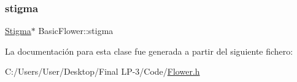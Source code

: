 \subsubsection{\texorpdfstring{stigma}{stigma}}
{\footnotesize\ttfamily \mbox{\hyperlink{class_stigma}{Stigma}}$\ast$ Basic\+Flower\+::stigma}



La documentación para esta clase fue generada a partir del siguiente fichero\+:\begin{DoxyCompactItemize}
\item 
C\+:/\+Users/\+User/\+Desktop/\+Final L\+P-\/3/\+Code/\mbox{\hyperlink{_flower_8h}{Flower.\+h}}\end{DoxyCompactItemize}
